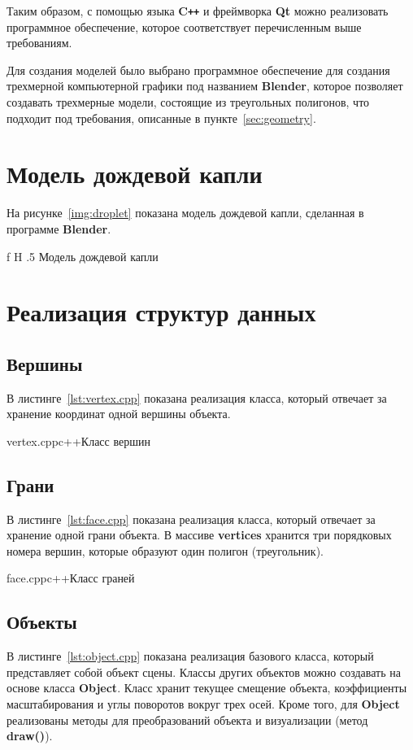 Таким образом, с помощью языка \textbf{C\texttt{++}} и фреймворка \textbf{Qt} можно реализовать программное обеспечение, которое соответствует перечисленным выше требованиям.

Для создания моделей было выбрано программное обеспечение для создания трехмерной компьютерной графики под названием \textbf{Blender}, которое позволяет создавать трехмерные модели, состоящие из треугольных полигонов, что подходит под требования, описанные в пункте~\ref{sec:geometry}.

\section{Модель дождевой капли}

На рисунке~\ref{img:droplet} показана модель дождевой капли, сделанная в программе \textbf{Blender}.

    {f}
    {H}
    {.5\textwidth}
    {Модель дождевой капли}

\pagebreak
\section{Реализация структур данных}

\subsection{Вершины}

В листинге~\ref{lst:vertex.cpp} показана реализация класса, который отвечает за хранение координат одной вершины объекта.

{vertex.cpp}{c++}{Класс вершин}

\pagebreak
\subsection{Грани}

В листинге~\ref{lst:face.cpp} показана реализация класса, который отвечает за хранение одной грани объекта. 
В массиве \textbf{vertices} хранится три порядковых номера вершин, которые образуют один полигон (треугольник).

{face.cpp}{c++}{Класс граней}

\subsection{Объекты}

В листинге~\ref{lst:object.cpp} показана реализация базового класса, который представляет собой объект сцены. 
Классы других объектов можно создавать на основе класса \textbf{Object}. 
Класс хранит текущее смещение объекта, коэффициенты масштабирования и углы поворотов вокруг трех осей. 
Кроме того, для \textbf{Object} реализованы методы для преобразований объекта и визуализации (метод \textbf{draw()}).

